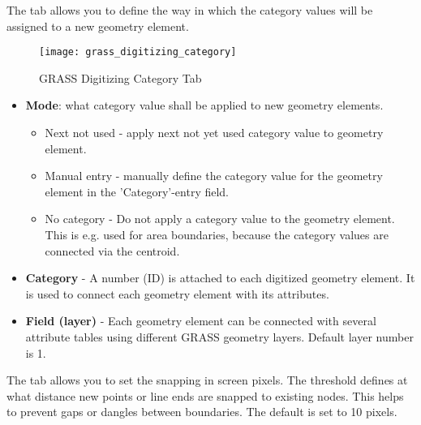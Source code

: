 
The  tab allows you to define the way in which the category 
values will be assigned to a new geometry element.

\begin{figure}[h]
 \begin{center}
  \caption{GRASS Digitizing Category Tab \nixcaption}\label{fig:grass_digitizing_category}
  \texttt{[image: grass\_digitizing\_category]}
 \end{center}
\end{figure}

\begin{itemize}
\item \textbf{Mode}: what category value shall be applied to new geometry 
elements.
\begin{itemize}
\item Next not used - apply next not yet used category value to geometry
element.
\item Manual entry - manually define the category value for the geometry
element in the 'Category'-entry field.
\item No category - Do not apply a category value to the geometry element.
This is e.g. used for area boundaries, because the category values are
connected via the centroid.
\end{itemize}
\item \textbf{Category} - A number (ID) is attached to each digitized geometry
element. It is used to connect each geometry element with its attributes.
\item \textbf{Field (layer)} - Each geometry element can be connected with
several attribute tables using different GRASS geometry layers. Default layer
number is 1. 
\end{itemize}

\begin{Tip}\caption{\textsc{Creating an additional GRASS 'layer' with QGIS}}
\end{Tip}

\label{label_settingtab}

The  tab allows you to set the snapping in screen pixels. The
threshold defines at what distance new points or line ends are snapped to
existing nodes. This helps to prevent gaps or dangles between boundaries. The
default is set to 10 pixels.

